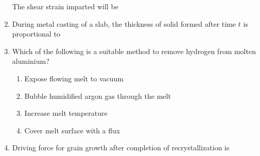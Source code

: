 \documentclass[journal,12pt,onecolumn]{IEEEtran}
\theoremstyle{remark}
\begin{document}
\begin{enumerate}
\begin{figure}[H]
\label{fig:19.png}
        \end{figure}
    The shear strain imparted will be
    \hfill{} 
    \begin{enumerate}[label=(\Alph*)]
    \end{enumerate}
    \item During metal casting of a slab, the thickness of solid formed after time $t$ is proportional to
    \hfill{}
    \begin{enumerate}[label=(\Alph*)]
    \end{enumerate}

    \item Which of the following is a suitable method to remove hydrogen from molten aluminium?
    \hfill{}
    \begin{enumerate}[label=(\Alph*)]
    \item Expose flowing melt to vacuum
    \item Bubble humidified argon gas through the melt
    \item Increase melt temperature
    \item Cover melt surface with a flux
    \end{enumerate}

    \item Driving force for grain growth after completion of recrystallization is
    \hfill{}
    \begin{enumerate}[label=(\Alph*)]
    \end{enumerate}


\end{enumerate}
\end{document}
